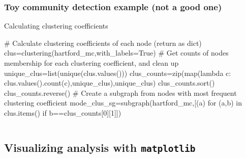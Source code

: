 \documentclass[xcolor=dvipsnames, 9pt]{beamer}
\newenvironment{code}{\begin{semiverbatim} \begin{footnotesize}}
{\end{footnotesize}\end{semiverbatim}}
\begin{document}
\begin{frame}[fragile]
    \frametitle{Toy community detection example (not a good one)}
    \begin{block}{Calculating clustering coefficients}
        \begin{code}
\scriptsize{\alert<2>{# Calculate clustering coefficients of each node (return as dict)
clus=clustering(hartford_mc,with_labels=True)}
\alert<3>{# Get counts of nodes membership for each clustering coefficient, and clean up
unique_clus=list(unique(clus.values()))
clus_counts=zip(map(lambda c: clus.values().count(c),unique_clus),unique_clus)
clus_counts.sort()
clus_counts.reverse()}
\alert<4>{# Create a subgraph from nodes with most frequent clustering coefficient
mode_clus_sg=subgraph(hartford_mc,[(a) for (a,b) in clus.items() if b==clus_counts[0][1]])}}         
        \end{code}
    \end{block}
    \begin{columns}
        \begin{itemize}
        \end{itemize}
    \end{columns}
\end{frame}



\subsection{Visualizing analysis with \texttt{matplotlib}} %
\label{sub:visualizing_analysis_with_matplotlib}
\end{document}
